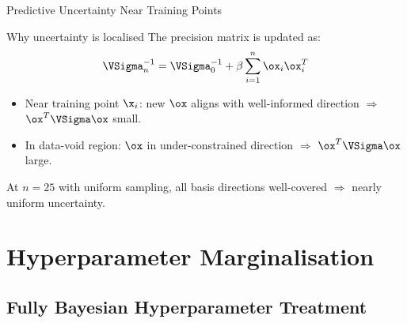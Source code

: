 \begin{frame}{Predictive Uncertainty Near Training Points}
  \begin{block}{Why uncertainty is localised}
    The precision matrix is updated as:
    \[
      \VSigma_n^{-1} = \VSigma_0^{-1} + \beta\sum_{i=1}^n \ox_i\ox_i^T
    \]
    \begin{itemize}
      \item Near training point $\x_i$: new $\ox$ aligns with well-informed direction $\Rightarrow$ $\ox^T\VSigma\ox$ \alert{small}.
      \item In data-void region: $\ox$ in under-constrained direction $\Rightarrow$ $\ox^T\VSigma\ox$ \alert{large}.
    \end{itemize}
  \end{block}
  \vspace{.3em}
  At $n=25$ with uniform sampling, all basis directions well-covered $\Rightarrow$ nearly uniform uncertainty.
\end{frame}

\section{Hyperparameter Marginalisation}

\subsection{Fully Bayesian Hyperparameter Treatment}

